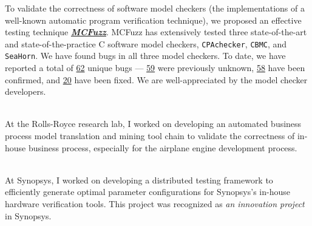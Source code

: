 \documentclass[margin]{res}
\begin{document}
\begin{resume}
To validate the correctness of software model checkers (the implementations of a well-known automatic program verification technique), we proposed an effective testing technique \textbf{\emph{\href{https://github.com/MCFuzzer/MCFuzz}{MCFuzz}}}. MCFuzz has extensively tested three state-of-the-art and state-of-the-practice C software model checkers, \texttt{CPAchecker}, \texttt{CBMC}, and \texttt{SeaHorn}. We have found bugs in all
three model checkers. To date, we have reported a total of \underline{62} unique bugs --- \underline{59} were previously unknown, \underline{58} have been confirmed, and \underline{20} have been fixed. We are well-appreciated by the model checker developers.

\\
At the Rolls-Royce research lab, I worked on developing an automated business process model translation and mining tool chain to validate the correctness of in-house business process, especially for the airplane engine development process.  

\\
At Synopsys, I worked on developing a distributed testing framework to efficiently generate optimal parameter configurations for Synopsys's in-house hardware verification tools. This project was recognized as \emph{an innovation project} in Synopsys.


\end{resume}
\end{document}

